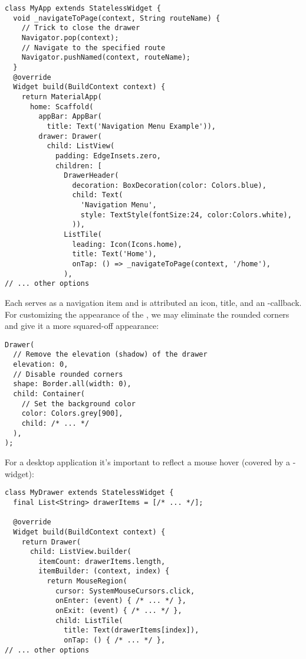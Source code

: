 \begin{lstlisting}
class MyApp extends StatelessWidget {
  void _navigateToPage(context, String routeName) {
    // Trick to close the drawer
    Navigator.pop(context); 
    // Navigate to the specified route
    Navigator.pushNamed(context, routeName); 
  }
  @override
  Widget build(BuildContext context) {
    return MaterialApp(
      home: Scaffold(
        appBar: AppBar(
          title: Text('Navigation Menu Example')),
        drawer: Drawer(
          child: ListView(
            padding: EdgeInsets.zero,
            children: [
              DrawerHeader(
                decoration: BoxDecoration(color: Colors.blue),
                child: Text(
                  'Navigation Menu',
                  style: TextStyle(fontSize:24, color:Colors.white),
                )),
              ListTile(
                leading: Icon(Icons.home),
                title: Text('Home'),
                onTap: () => _navigateToPage(context, '/home'),
              ),
// ... other options
\end{lstlisting}

\noindent Each  serves as a navigation item and is attributed an icon, title, and an -callback. 
For customizing the appearance of the , we may eliminate the rounded corners and give it a more squared-off 
appearance:

\begin{lstlisting}
Drawer(
  // Remove the elevation (shadow) of the drawer
  elevation: 0,
  // Disable rounded corners
  shape: Border.all(width: 0), 
  child: Container(
    // Set the background color
    color: Colors.grey[900], 
    child: /* ... */
  ),
);
\end{lstlisting}

\noindent For a desktop application it's important to reflect a mouse hover (covered by a -widget): 

\begin{lstlisting}
class MyDrawer extends StatelessWidget {
  final List<String> drawerItems = [/* ... */];

  @override
  Widget build(BuildContext context) {
    return Drawer(
      child: ListView.builder(
        itemCount: drawerItems.length,
        itemBuilder: (context, index) {
          return MouseRegion(
            cursor: SystemMouseCursors.click,
            onEnter: (event) { /* ... */ },
            onExit: (event) { /* ... */ },
            child: ListTile(
              title: Text(drawerItems[index]),
              onTap: () { /* ... */ },
// ... other options
\end{lstlisting}

